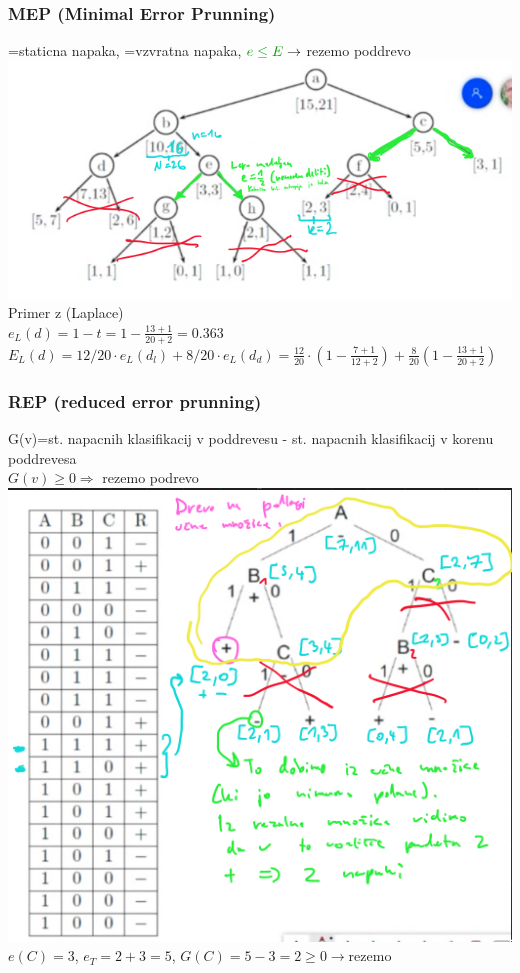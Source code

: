 \subsubsection{MEP (Minimal Error Prunning)}
=staticna napaka, =vzvratna napaka, $\green{e\leq E} \rightarrow$ rezemo poddrevo\\
\includegraphics[width=\columnwidth]{./images/mep.png}\\
Primer z (Laplace)\\
$e_L(d)=1-t=1-\frac{13+1}{20+2}=0.363$\\
$E_L(d)=12/20\cdot e_L(d_l) + 8/20\cdot e_L(d_d)= \frac{12}{20} \cdot(1-\frac{7+1}{12+2})+\frac{8}{20}(1-\frac{13+1}{20+2})$\\

\subsubsection{REP (reduced error prunning)} 
G(v)=st. napacnih klasifikacij v poddrevesu - st. napacnih klasifikacij v korenu poddrevesa\\
$G(v)\geq 0 \Rightarrow$ rezemo podrevo\\
\includegraphics[width=\columnwidth]{./images/rep.png}\\
$e(C)=3$,\;\;\; $e_T=2+3=5$,\;\;\; $G(C)=5-3=2\geq0 \rightarrow \text{rezemo}$

